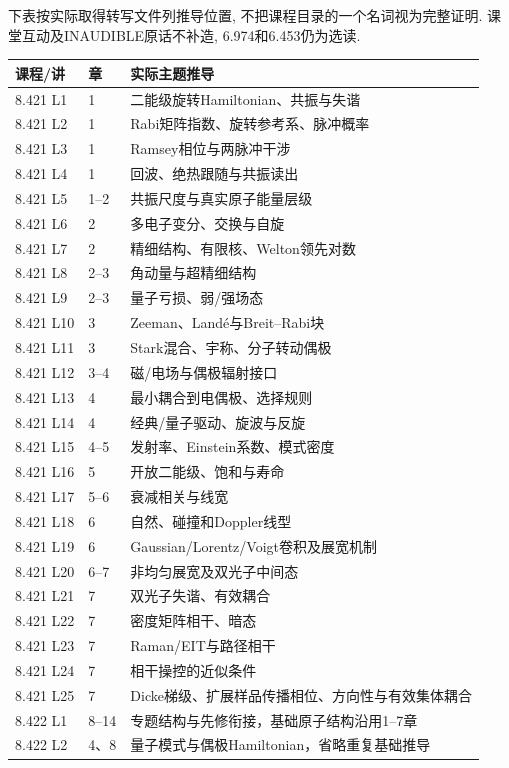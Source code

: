 下表按实际取得转写文件列推导位置, 不把课程目录的一个名词视为完整证明. 课堂互动及INAUDIBLE原话不补造, 6.974和6.453仍为选读.
\begin{longtable}{p{.15\linewidth}p{.13\linewidth}p{.62\linewidth}}
\toprule 课程/讲 & 章 & 实际主题推导\\\midrule\endhead
8.421 L1 & 1 & 二能级旋转Hamiltonian、共振与失谐\\
8.421 L2 & 1 & Rabi矩阵指数、旋转参考系、脉冲概率\\
8.421 L3 & 1 & Ramsey相位与两脉冲干涉\\
8.421 L4 & 1 & 回波、绝热跟随与共振读出\\
8.421 L5 & 1–2 & 共振尺度与真实原子能量层级\\
8.421 L6 & 2 & 多电子变分、交换与自旋\\
8.421 L7 & 2 & 精细结构、有限核、Welton领先对数\\
8.421 L8 & 2–3 & 角动量与超精细结构\\
8.421 L9 & 2–3 & 量子亏损、弱/强场态\\
8.421 L10 & 3 & Zeeman、Landé与Breit--Rabi块\\
8.421 L11 & 3 & Stark混合、宇称、分子转动偶极\\
8.421 L12 & 3–4 & 磁/电场与偶极辐射接口\\
8.421 L13 & 4 & 最小耦合到电偶极、选择规则\\
8.421 L14 & 4 & 经典/量子驱动、旋波与反旋\\
8.421 L15 & 4–5 & 发射率、Einstein系数、模式密度\\
8.421 L16 & 5 & 开放二能级、饱和与寿命\\
8.421 L17 & 5–6 & 衰减相关与线宽\\
8.421 L18 & 6 & 自然、碰撞和Doppler线型\\
8.421 L19 & 6 & Gaussian/Lorentz/Voigt卷积及展宽机制\\
8.421 L20 & 6–7 & 非均匀展宽及双光子中间态\\
8.421 L21 & 7 & 双光子失谐、有效耦合\\
8.421 L22 & 7 & 密度矩阵相干、暗态\\
8.421 L23 & 7 & Raman/EIT与路径相干\\
8.421 L24 & 7 & 相干操控的近似条件\\
8.421 L25 & 7 & Dicke梯级、扩展样品传播相位、方向性与有效集体耦合\\
8.422 L1 & 8–14 & 专题结构与先修衔接，基础原子结构沿用1–7章\\
8.422 L2 & 4、8 & 量子模式与偶极Hamiltonian，省略重复基础推导\\

\end{longtable}
